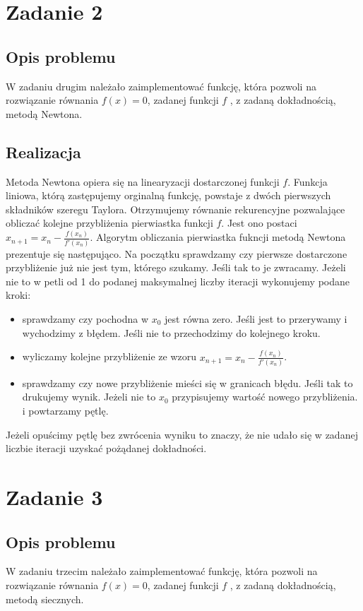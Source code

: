 \documentclass[]{article}
\begin{document}
\section{Zadanie 2}
\subsection{Opis problemu}
W zadaniu drugim należało zaimplementować funkcję, która pozwoli na rozwiązanie równania $f(x) = 0$, zadanej funkcji $f$ , z zadaną dokładnością, metodą Newtona.
\subsection{Realizacja}
Metoda Newtona opiera się na linearyzacji dostarczonej funkcji $f$. Funkcja liniowa, którą zastępujemy orginalną funkcję, powstaje z dwóch pierwszych składników szeregu Taylora. Otrzymujemy równanie rekurencyjne pozwalające obliczać kolejne przybliżenia pierwiastka funkcji $f$. Jest ono postaci $x_{n+1} = x_n - \frac{f(x_n)}{f'(x_n)}$. Algorytm obliczania pierwiastka fukncji metodą Newtona prezentuje się następująco. Na początku sprawdzamy czy pierwsze dostarczone przybliżenie już nie jest tym, którego szukamy. Jeśli tak to je zwracamy. Jeżeli nie to w petli od 1 do podanej maksymalnej liczby iteracji wykonujemy podane kroki:
\begin{itemize}
\item sprawdzamy czy pochodna w $x_0$ jest równa zero. Jeśli jest to przerywamy i wychodzimy z błędem. Jeśli nie to przechodzimy do kolejnego kroku.
\item wyliczamy kolejne przybliżenie ze wzoru $x_{n+1} = x_n - \frac{f(x_n)}{f'(x_n)}$.
\item sprawdzamy czy nowe przybliżenie mieści się w granicach błędu. Jeśli tak to drukujemy wynik. Jeżeli nie to $x_0$ przypisujemy wartość nowego przybliżenia. i powtarzamy pętlę.
\end{itemize}  
Jeżeli opuścimy pętlę bez zwrócenia wyniku to znaczy, że nie udało się w zadanej liczbie iteracji uzyskać pożądanej dokładności.

\section{Zadanie 3}
\subsection{Opis problemu}
W zadaniu trzecim należało zaimplementować funkcję, która pozwoli na rozwiązanie równania $f(x) = 0$, zadanej funkcji $f$ , z zadaną dokładnością, metodą siecznych.
\end{document}
